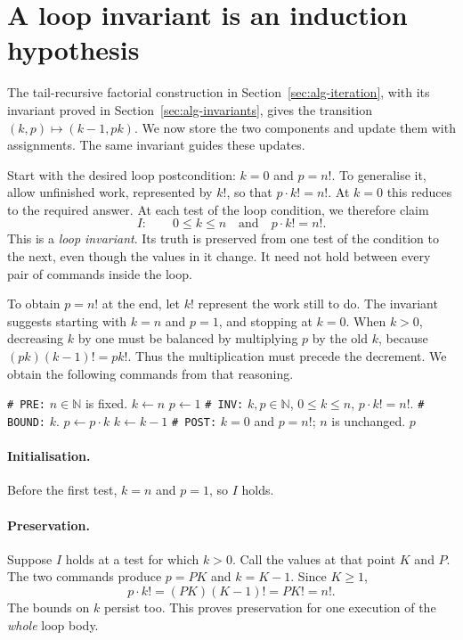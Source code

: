 \section{A loop invariant is an induction hypothesis}

The tail-recursive factorial construction in Section~\ref{sec:alg-iteration}, with its invariant proved in Section~\ref{sec:alg-invariants}, gives the transition
$(k,p)\mapsto(k-1,pk)$. We now store the two components and update them
with assignments. The same invariant guides these updates.

Start with the desired loop postcondition: $k=0$ and $p=n!$.
To generalise it, allow unfinished work, represented by $k!$, so that
$p\cdot k!=n!$. At $k=0$ this reduces to the required answer.
At each test of the loop condition, we therefore claim
\[
I:\qquad 0\leq k\leq n\quad\text{and}\quad p\cdot k!=n!.
\]
This is a \emph{loop invariant}. Its truth is preserved from one test of
the condition to the next, even though the values in it change.
It need not hold between every pair of commands inside the loop.


To obtain $p=n!$ at the end, let $k!$ represent the work still to do.
The invariant suggests starting with $k=n$ and $p=1$, and stopping at
$k=0$. When $k>0$, decreasing $k$ by one must be balanced by multiplying
$p$ by the old $k$, because $(pk)(k-1)!=pk!$. Thus the multiplication must
precede the decrement. We obtain the following commands from that reasoning.

\begin{algorithm}[H]
\begin{algorithmic}[1]
\Statex \texttt{\# PRE:} $n\in\mathbb N$ is fixed.
\State $k\leftarrow n$
\State $p\leftarrow1$
\Statex \texttt{\# INV:} $k,p\in\mathbb N$, $0\leq k\leq n$, $p\cdot k!=n!$.
\Statex \texttt{\# BOUND:} $k$.
\State $p\leftarrow p\cdot k$
\State $k\leftarrow k-1$
\EndWhile
\Statex \texttt{\# POST:} $k=0$ and $p=n!$; $n$ is unchanged.
\State \Return $p$
\EndProcedure
\end{algorithmic}
\caption{Factorial by successive changes of state.}
\end{algorithm}

\paragraph{Initialisation.}
Before the first test, $k=n$ and $p=1$, so $I$ holds.

\paragraph{Preservation.}
Suppose $I$ holds at a test for which $k>0$. Call the values at that point
$K$ and $P$. The two commands produce $p=PK$ and $k=K-1$. Since $K\geq1$,
\[
p\cdot k!=(PK)(K-1)!=P K!=n!.
\]
The bounds on $k$ persist too. This proves preservation for one execution
of the \emph{whole} loop body.

